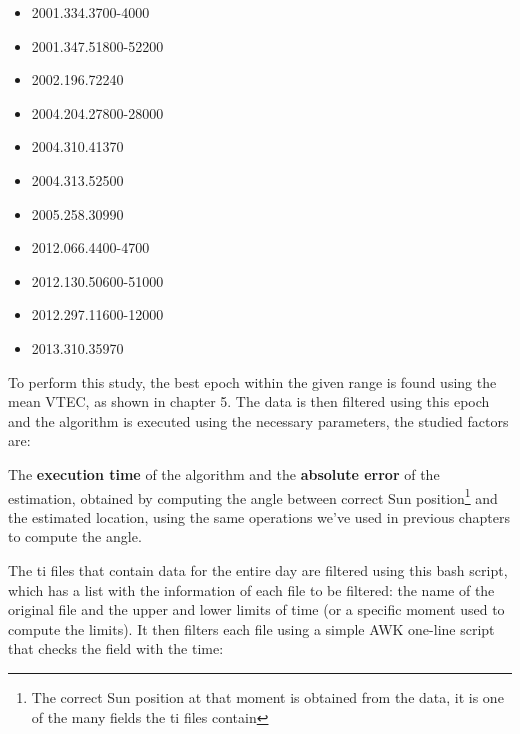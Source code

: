 \begin{itemize}
	\item 2001.334.3700-4000
	\item 2001.347.51800-52200
	\item 2002.196.72240
	\item 2004.204.27800-28000
	\item 2004.310.41370
	\item 2004.313.52500
	\item 2005.258.30990
	\item 2012.066.4400-4700
	\item 2012.130.50600-51000
	\item 2012.297.11600-12000
	\item 2013.310.35970
\end{itemize}

To perform this study, the best epoch within the given range is found using the mean VTEC, as shown in chapter 5. The data is then filtered using this epoch and the algorithm is executed using the necessary parameters, the studied factors are:

The \textbf{execution time} of the algorithm and the \textbf{absolute error} of the estimation, obtained by computing the angle between correct Sun position\footnote{The correct Sun position at that moment is obtained from the data, it is one of the many fields the ti files contain} and the estimated location, using the same operations we've used in previous chapters to compute the angle. 

The ti files that contain data for the entire day are filtered using this bash script, which has a list with the information of each file to be filtered: the name of the original file and the upper and lower limits of time (or a specific moment used to compute the limits). It then filters each file using a simple AWK one-line script that checks the field with the time:

